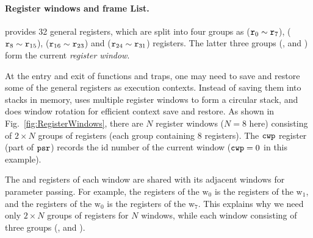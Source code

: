\paragraph{\textbf{Register windows and frame List.}}
\sparc{} provides 32 general registers, which are split into
four groups
as \globalRN{} ($\texttt{r}_{0} \sim \texttt{r}_{7}$),
\outRN{} ($\texttt{r}_{8} \sim \texttt{r}_{15}$), \localRN ($\texttt{r}_{16} \sim \texttt{r}_{23}$)
and \inRN{} ($\texttt{r}_{24} \sim \texttt{r}_{31}$) registers.
The latter three groups (\outRN{}, \localRN{} and \inRN{})
form the current {\em register window}.

At the entry and exit of functions and traps, one may need to
save and restore some of the general registers as execution
contexts. Instead of saving them into stacks in memory,
\sparc{} uses multiple register windows to form a circular
stack, and does window rotation for efficient context save and restore.
As shown in Fig.~\ref{fig:RegisterWindows}, there are $N$
register windows ($N=8$ here) consisting of $2\times N$
groups of registers (each group containing 8 registers).
The $\texttt{cwp}$ register (part of $\texttt{psr}$) records the id number
of the current window ($\texttt{cwp}=0$ in this example).

The \inRN{} and \outRN{} registers of each window are shared
with its adjacent windows for parameter passing.
For example, the \inRN{} registers of the $\text{w}_0$
is the \outRN{} registers of the $\text{w}_1$,
and the \outRN{} registers of the $\text{w}_0$
is the \inRN{} registers of the $\text{w}_7$.
This explains
why we need only $2\times N$ groups of registers for
$N$ windows, while each window consisting of
three groups (\outRN{}, \localRN{} and \inRN{}).


